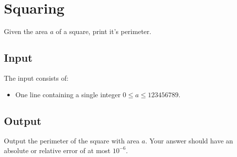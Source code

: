 \section{Squaring}

\newcommand{\maxa}{123456789}

Given the area $a$ of a square, print it's perimeter.

\subsection*{Input}
The input consists of:
\begin{itemize}
	\item One line containing a single integer $0\leq a\leq \maxa$.
\end{itemize}

\subsection*{Output}
Output the perimeter of the square with area $a$.
Your answer should have an absolute or relative error of at most $10^{-6}$.

